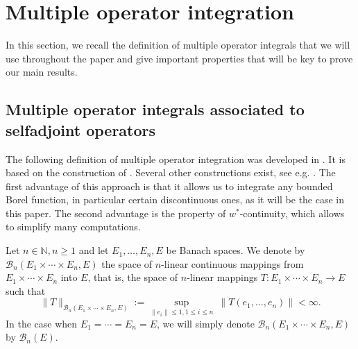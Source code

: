 \documentclass[12pt]{amsart}
\theoremstyle{remark}
\begin{document}
\section{Multiple operator integration}\label{MOI}

In this section, we recall the definition of multiple operator integrals that we will use throughout the paper and give important properties that will be key to prove our main results.

\subsection{Multiple operator integrals associated to selfadjoint operators}

The following definition of multiple operator integration was developed in \cite{CLS}. It is based on the construction of \cite{Pav}. Several other constructions exist, see e.g. \cite{ACDS,BS1,DK1956,Peller2006,PSS-SSF}. The first advantage of this approach is that it allows us to integrate any bounded Borel function, in particular certain discontinuous ones, as it will be the case in this paper. The second advantage is the property of $w^*$-continuity, which allows to simplify many computations.


Let $n\in \mathbb{N}, n\geq 1$ and let $E_1, \ldots, E_n, E$ be Banach spaces. We denote by $\mathcal{B}_n(E_1 \times \cdots \times E_n, E)$ the space of $n$-linear continuous mappings from $E_1 \times \cdots \times E_n$ into $E$, that is, the space of $n$-linear mappings $T : E_1 \times \cdots \times E_n \to E$ such that
$$
\|T\|_{\mathcal{B}_n(E_1 \times \cdots \times E_n, E)} := \sup_{\|e_i\| \leq 1, 1\leq i \leq n} ~ \|T(e_1, \ldots, e_n)\| < \infty.
$$
In the case when $E_1  = \cdots = E_n = E$, we will simply denote $\mathcal{B}_n(E_1 \times \cdots \times E_n, E)$ by $\mathcal{B}_n(E)$.
\end{document}
